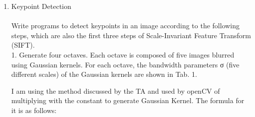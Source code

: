 \documentclass[12pt]{article}
\newenvironment{QandA}
{
	\begin{enumerate}[label=\normalfont\arabic*.,leftmargin=2em,rightmargin=2em]\normalfont
	}
	{
	\end{enumerate}
}
\newenvironment{codelalala}{}{}
\newenvironment{answered}{\setlength{\parindent}{1em}\par\normalfont}{}
\begin{document}
\begin{QandA}
\begin{answered}
\begin{codelalala}
\begin{verbatim}
print("Original image size: {:4d} x {:4d}".format(a.shape[0], a.shape[1]))
print("Resulting image size: {:4d} x {:4d}".format(combined_norm.shape[0], combined_norm.shape[1]))
		\end{verbatim}
		\end{codelalala}
		Observations:
		\\
		Edge detection along x and y directions have been computed(See Fig \ref{edge-detection}). I have also combined both the edges,see Fig. \ref{edge-detection-combined}. When I was using the old basic divide by 255 normalization, I was missing few edges however, when I used the absolute valued normalization, the results were better.
	\begin{figure}
		\centering
  			\caption{Combined edge detected in x and y axis}
  		\label{edge-detection-combined}
	\end{figure}
	\end{answered}
	\item Keypoint Detection
	\\
	\\
	Write programs to detect keypoints in an image according to the following steps, which are also the first three steps of Scale-Invariant Feature Transform (SIFT).
\\
1.	Generate four octaves. Each octave is composed of five images blurred using Gaussian kernels. For each
octave, the bandwidth parameters σ (five different scales) of the Gaussian kernels are shown in Tab. 1.
\begin{answered}
I am using the method discussed by the TA and used by openCV of multiplying with the constant to generate Gaussian Kernel. The formula for it is as follows:

\end{answered}
\end{QandA}
\end{document}
